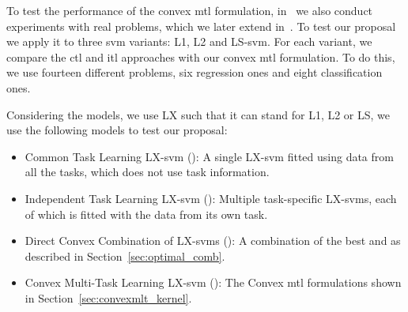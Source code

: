 To test the performance of the convex \acrshort{mtl} formulation, in~\citet{RuizAD19} we also conduct experiments with real problems, which we later extend in~\citet{RuizAD21}. 
To test our proposal we apply it to three \acrshort{svm} variants: L1, L2 and LS-\acrshort{svm}. For each variant, we compare the \acrshort{ctl} and \acrshort{itl} approaches with our convex \acrshort{mtl} formulation. To do this, we use fourteen different problems, six regression ones and eight classification ones.

Considering the models, we use {LX} such that it can stand for {L1}, {L2} or {LS}, we use the following models to test our proposal:
\begin{itemize}
    \item {Common Task Learning LX-\acrshort{svm} ()}: A single LX-\acrshort{svm} fitted using data from all the tasks, which does not use task information.
    \item {Independent Task Learning LX-\acrshort{svm} ()}: Multiple task-specific LX-\acrshort{svm}s, each of which is fitted with the data from its own task.
    \item {Direct Convex Combination of LX-\acrshort{svm}s ()}: A combination of the best  and  as described in Section~\ref{sec:optimal_comb}.
    \item {Convex Multi-Task Learning LX-\acrshort{svm} ()}: The Convex \acrshort{mtl} formulations shown in Section~\ref{sec:convexmlt_kernel}.
\end{itemize}

